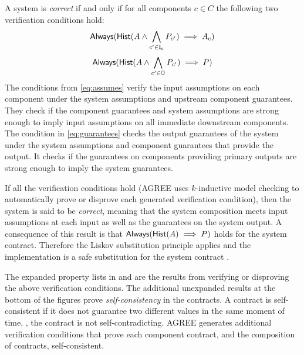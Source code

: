 A system is
\emph{correct} if and only if for all components $c \in C$ the
following two verification conditions hold:
\begin{equation}\label{eq:assumes}
            \mathsf{Always}(\mathsf{Hist}(A \wedge
            \bigwedge_{c^\prime \in \mathbb{I}_{c}} P_{c^\prime})
            \implies A_{c})
\end{equation}
\begin{equation}\label{eq:guarantees}
            \mathsf{Always}(\mathsf{Hist}(A \wedge
            \bigwedge_{c^\prime \in \mathbb{O}} P_{c^\prime})
            \implies P)
\end{equation}
The conditions from \eqref{eq:assumes} verify the input assumptions on
each component under the system assumptions and upstream component
guarantees.  They check if the component guarantees and system
assumptions are strong enough to imply input assumptions on all
immediate downstream components.  The condition in
\eqref{eq:guarantees} checks the output guarantees of the system under
the system assumptions and component guarantees that provide the
output.  It checks if the guarantees on components providing primary
outputs are strong enough to imply the system guarantees.

If all the verification conditions hold (AGREE uses $k$-inductive
model checking to automatically prove or disprove each generated
verification condition), then the system is said to be \emph{correct},
meaning that the system composition meets input assumptions at each
input as well as the guarantees on the system output. A consequence of
this result is that $\mathsf{Always}(\mathsf{Hist}(A) \implies
P)$ holds for the system contract.  Therefore the Liskov
substitution principle applies and the implementation is a safe
substitution for the system contract \cite{10.1145/62139.62141}.

The expanded property lists in  and
 are the results from verifying or
disproving the above verification conditions.  The additional
unexpanded results at the bottom of the figures prove
\emph{self-consistency} in the contracts.
A contract is self-consistent if it does not guarantee two different values in the same moment of time, \ie, the contract is not self-contradicting.
AGREE generates additional verification
conditions that prove each component contract, and the composition of
contracts, self-consistent.
